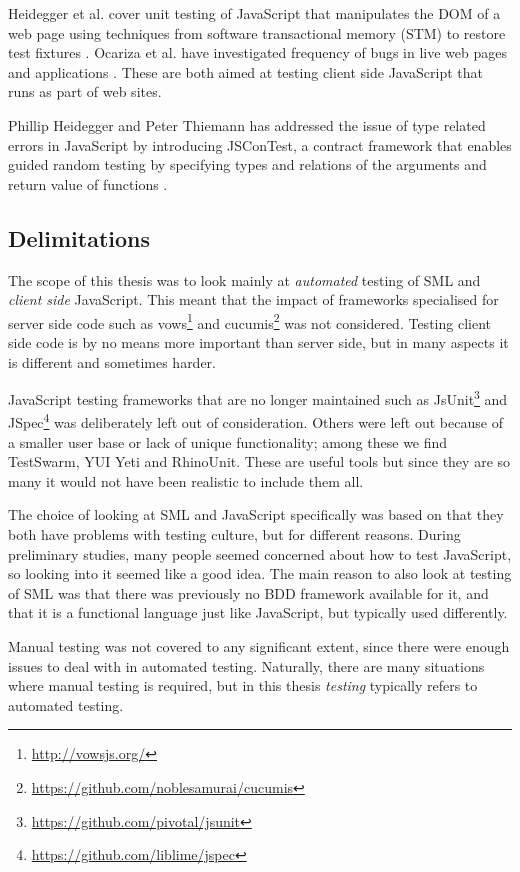 \documentclass[11pt]{article}
\begin{document}
Heidegger et al. cover unit testing of JavaScript that manipulates the DOM of a web page using techniques from software transactional memory (STM) to restore test fixtures \cite{DOMJavascript}. Ocariza et al. have investigated frequency of bugs in live web pages and applications \cite{Wild}. These are both aimed at testing client side JavaScript that runs as part of web sites.

Phillip Heidegger and Peter Thiemann has addressed the issue of type related errors in JavaScript by introducing JSConTest, a contract framework that enables guided random testing by specifying types and relations of the arguments and return value of functions \cite{ContractTesting}.

\subsection{Delimitations}

The scope of this thesis was to look mainly at \emph{automated} testing of SML and \emph{client side} JavaScript. This meant that the impact of frameworks specialised for server side code such as vows\footnote{\url{http://vowsjs.org/}} and cucumis\footnote{\url{https://github.com/noblesamurai/cucumis}} was not considered. Testing client side code is by no means more important than server side, but in many aspects it is different and sometimes harder.

JavaScript testing frameworks that are no longer maintained such as JsUnit\footnote{\url{https://github.com/pivotal/jsunit}} and JSpec\footnote{\url{https://github.com/liblime/jspec}} was deliberately left out of consideration. Others were left out because of a smaller user base or lack of unique functionality; among these we find TestSwarm, YUI Yeti and RhinoUnit. These are useful tools but since they are so many it would not have been realistic to include them all.

The choice of looking at SML and JavaScript specifically was based on that they both have problems with testing culture, but for different reasons. During preliminary studies, many people seemed concerned about how to test JavaScript, so looking into it seemed like a good idea. The main reason to also look at testing of SML was that there was previously no BDD framework available for it, and that it is a functional language just like JavaScript, but typically used differently.

Manual testing was not covered to any significant extent, since there were enough issues to deal with in automated testing. Naturally, there are many situations where manual testing is required, but in this thesis \emph{testing} typically refers to automated testing.
\end{document}

